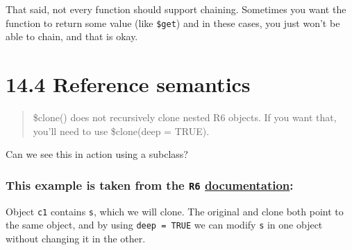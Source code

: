 \documentclass[]{book}
\begin{document}
That said, not every function should support chaining. Sometimes you want the function to return some value (like \texttt{\$get}) and in these cases, you just won't be able to chain, and that is okay.

\hypertarget{reference-semantics}{%
\section*{14.4 Reference semantics}\label{reference-semantics}}

\begin{quote}
\$clone() does not recursively clone nested R6 objects. If you want that, you'll need to use \$clone(deep = TRUE).
\end{quote}

Can we see this in action using a subclass?

\hypertarget{this-example-is-taken-from-the-r6-documentation}{%
\subsubsection*{\texorpdfstring{This example is taken from the \texttt{R6} \href{https://r6.r-lib.org/articles/Introduction.html}{documentation}:}{This example is taken from the R6 documentation:}}\label{this-example-is-taken-from-the-r6-documentation}}

Object \texttt{c1} contains \texttt{s}, which we will clone. The original and clone both point to the same object, and by using \texttt{deep\ =\ TRUE} we can modify \texttt{s} in one object without changing it in the other.
\end{document}
